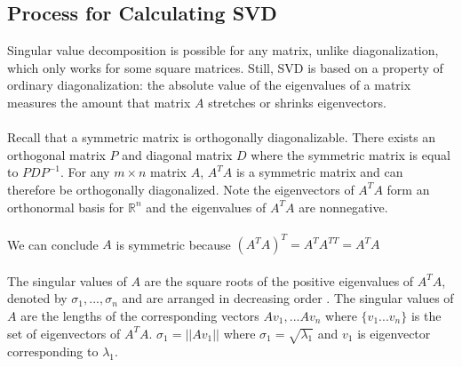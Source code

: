 \documentclass[12pt, reqno]{amsart}
\theoremstyle{definition}
\theoremstyle{remark}
\numberwithin{equation}{section}
\begin{document}
\subsection{Process for Calculating SVD}
Singular value decomposition is possible for any matrix, unlike diagonalization, which only works for some square matrices. Still, SVD is based on a property of ordinary diagonalization: the absolute value of the eigenvalues of a matrix measures the amount that matrix $A$ stretches or shrinks eigenvectors.\\\\
Recall that a symmetric matrix is orthogonally diagonalizable. There exists an orthogonal matrix $P$ and diagonal matrix $D$ where the symmetric matrix is equal to $PDP^{-1}$. For any $m \times n$ matrix $A$, $A^TA$ is a symmetric matrix and can therefore be orthogonally diagonalized. Note the eigenvectors of $A^TA$ form an orthonormal basis for $\mathbb{R}^n$ and the eigenvalues of $A^TA$ are nonnegative.\\\\
We can conclude $A$ is symmetric because $(A^TA)^T = A^TA^{TT} = A^TA$\\\\
The singular values of $A$ are the square roots of the positive eigenvalues of $A^TA$, denoted by $\sigma_1,...,\sigma_n$ and are arranged in decreasing order \cite{Fitzpatrick}. The singular values of $A$ are the lengths of the corresponding vectors $Av_1,...Av_n$ where $\{v_1...v_n\}$ is the set of eigenvectors of $A^TA$. $\sigma_1 = ||Av_1||$ where $\sigma_1 = \sqrt{\lambda_1}$ and $v_1$ is eigenvector corresponding to $\lambda_1$.
\end{document}
